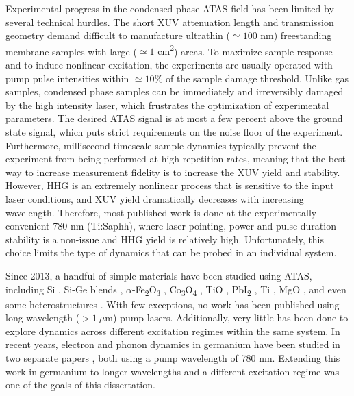 Experimental progress in the condensed phase ATAS field has been limited by several technical hurdles. The short XUV attenuation length and transmission geometry demand difficult to manufacture ultrathin ({$\simeq 100$ nm}) freestanding membrane samples with large ({$\simeq 1$ cm\textsuperscript{2}}) areas. To maximize sample response and to induce nonlinear excitation, the experiments are usually operated with pump pulse intensities within ${\simeq 10 \%}$ of the sample damage threshold. Unlike gas samples, condensed phase samples can be immediately and irreversibly damaged by the high intensity laser, which frustrates the optimization of experimental parameters. The desired ATAS signal is at most a few percent above the ground state signal, which puts strict requirements on the noise floor of the experiment. Furthermore, millisecond timescale sample dynamics typically prevent the experiment from being performed at high repetition rates, meaning that the best way to increase measurement fidelity is to increase the XUV yield and stability. However, HHG is an extremely nonlinear process that is sensitive to the input laser conditions, and XUV yield dramatically decreases with increasing wavelength. Therefore, most published work is done at the experimentally convenient 780 nm (Ti:Saphh), where laser pointing, power and pulse duration stability is a non-issue and HHG yield is relatively high. Unfortunately, this choice limits the type of dynamics that can be probed in an individual system.

Since 2013, a handful of simple materials have been studied using ATAS, including Si \cite{schultzeAttosecondBandgapDynamics2014,cushingDifferentiatingPhotoexcitedCarrier2019}, Si-Ge blends \cite{zurchUltrafastCarrierThermalization2017}, $\alpha$-Fe\textsubscript{2}O\textsubscript{3} \cite{vura-weisFemtosecondEdgeSpectroscopy2013}, Co\textsubscript{3}O\textsubscript{4} \cite{jiangCharacterizationPhotoInducedCharge2014}, TiO \cite{vaidaFemtosecondExtremeUltraviolet2016}, PbI\textsubscript{2} \cite{linCarrierSpecificFemtosecondXUV2017}, Ti \cite{volkovAttosecondScreeningDynamics2019}, MgO \cite{geneauxAttosecondTimeDomainMeasurement2020}, and even some heterostructures \cite{marshUltrafastTimeresolvedExtreme2018,cushingLayerresolvedUltrafastExtreme2020}. With few exceptions, no work has been published using long wavelength ($>1 \ \mu\textrm{m}$) pump lasers. Additionally, very little has been done to explore dynamics across different excitation regimes within the same system. In recent years, electron and phonon dynamics in germanium have been studied in two separate papers \cite{zurchDirectSimultaneousObservation2017,kaplanFemtosecondTrackingCarrier2018}, both using a pump wavelength of 780 nm. Extending this work in germanium to longer wavelengths and a different excitation regime was one of the goals of this dissertation.

